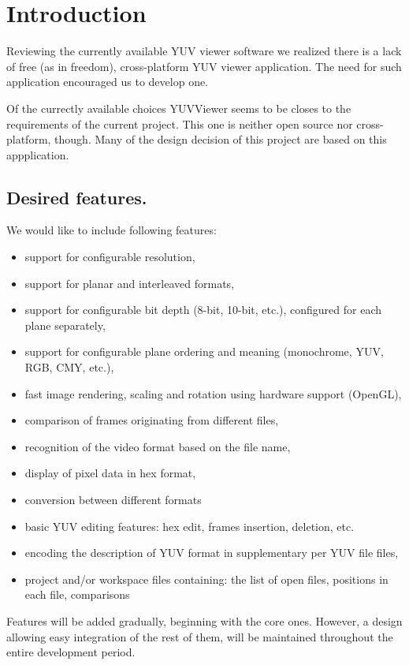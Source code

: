 \chapter{Introduction}
\label{chap:Introduction}

Reviewing the currently available YUV viewer software we realized there is a lack of free (as in freedom), cross-platform YUV viewer application. The need for such application encouraged us to develop one.

Of the currectly available choices YUVViewer\cite{YUVViewer} seems to be closes to the requirements of the current project. This one is neither open source nor cross-platform, though. Many of the design decision of this project are based on this appplication.

\section{Desired features.}

We would like to include following features:
\begin{itemize}
  \item{} support for configurable resolution,
  \item{} support for planar and interleaved formats,
  \item{} support for configurable bit depth (8-bit, 10-bit, etc.), configured for each plane separately,
  \item{} support for configurable plane ordering and meaning (monochrome, YUV, RGB, CMY, etc.),
  \item{} fast image rendering, scaling and rotation using hardware support (OpenGL),
  \item{} comparison of frames originating from different files,
  \item{} recognition of the video format based on the file name,
  \item{} display of pixel data in hex format,
  \item{} conversion between different formats
  \item{} basic YUV editing features: hex edit, frames insertion, deletion, etc.
  \item{} encoding the description of YUV format in supplementary per YUV file files,
  \item{} project and/or workspace files containing: the list of open files, positions in each file, comparisons
\end{itemize}

Features will be added gradually, beginning with the core ones. However, a design allowing easy integration of the rest of them, will be maintained throughout the entire development period.
